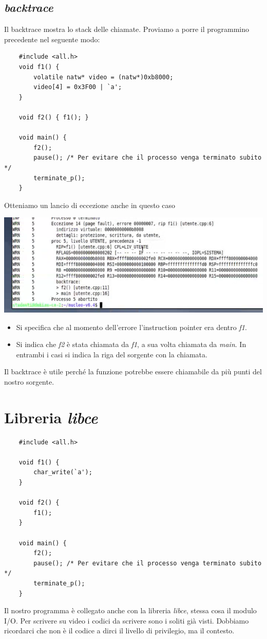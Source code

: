 \subsection{\emph{backtrace}} Il backtrace mostra lo stack delle chiamate. Proviamo a porre il programmino precedente nel seguente modo:
\small
\begin{verbatim}
	#include <all.h>
	void f1() {
		volatile natw* video = (natw*)0xb8000;
		video[4] = 0x3F00 | `a';
	}
	
	void f2() { f1(); }
	
	void main() {
		f2();
		pause(); /* Per evitare che il processo venga terminato subito */
		terminate_p();
	}
\end{verbatim}
\normalsize
Otteniamo un lancio di eccezione anche in questo caso
\begin{center}\includegraphics[scale=.85]{img/126.PNG}\end{center}
\begin{itemize}
	\item Si specifica che al momento dell'errore l'instruction pointer era dentro \emph{f1}.
	\item Si indica che \emph{f2} è stata chiamata da \emph{f1},  a sua volta chiamata da \emph{main}. In entrambi i casi si indica la riga del sorgente con la chiamata. 
\end{itemize}
Il backtrace è utile perché la funzione potrebbe essere chiamabile da più punti del nostro sorgente.

\section{Libreria \emph{libce}}
\small
\begin{verbatim}
	#include <all.h>
	
	void f1() {
		char_write(`a');
	}
	
	void f2() { 
		f1(); 
	}
	
	void main() {
		f2();
		pause(); /* Per evitare che il processo venga terminato subito */
		terminate_p();
	}
\end{verbatim}
\normalsize
Il nostro programma è collegato anche con la libreria \emph{libce}, stessa cosa il modulo I/O. Per scrivere su video i codici da scrivere sono i soliti già visti. Dobbiamo ricordarci che non è il codice a dirci il livello di privilegio, ma il contesto.